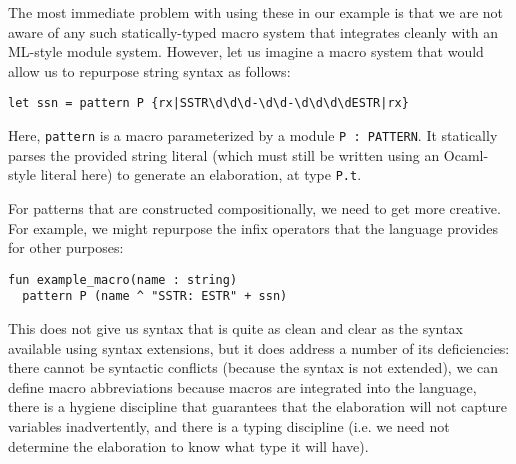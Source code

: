 The most immediate problem with using these in our example is that we are not aware of any such statically-typed macro system that integrates cleanly with an ML-style module system. However, let us imagine a macro system that would allow us to repurpose string syntax  as follows:
\begin{lstlisting}[numbers=none]
let ssn = pattern P {rx|SSTR\d\d\d-\d\d-\d\d\d\dESTR|rx}
\end{lstlisting}

Here, \lstinline{pattern} is a macro parameterized by a module \lstinline{P : PATTERN}. It statically parses the provided string literal (which must still be written using an Ocaml-style literal here) to generate an elaboration, at type \lstinline{P.t}. 

For patterns that are constructed compositionally, we need to get more creative. For example, we might repurpose the infix operators that the language provides for other purposes:

\begin{lstlisting}[numbers=none,escapechar=|]
fun example_macro(name : string)
  pattern P (name ^ "SSTR: ESTR" + ssn)
\end{lstlisting}

This does not give us syntax that is quite as clean and clear as the syntax available using syntax extensions, but it does address a number of its deficiencies: there cannot be syntactic conflicts (because the syntax is not extended), we can define macro abbreviations because macros are integrated into the language, there is a hygiene discipline that guarantees that the elaboration will not capture variables inadvertently, and there is a typing discipline (i.e. we need not determine the elaboration to know what type it will have). 


